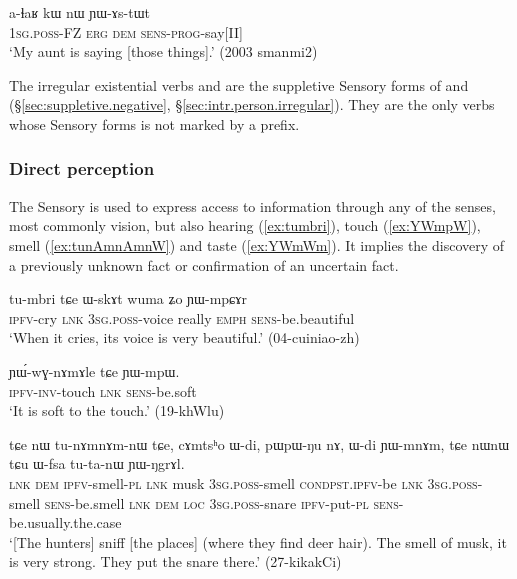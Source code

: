 \begin{exe}
\ex \label{ex:YAstWt}
\gll a-ɬaʁ kɯ nɯ ɲɯ-ɤs-tɯt \\
\textsc{1sg}.\textsc{poss}-FZ \textsc{erg} \textsc{dem} \textsc{sens}-\textsc{prog}-say[II] \\
\glt `My aunt is saying [those things].' (2003 smanmi2)
\end{exe}

The irregular existential verbs  and  are the suppletive Sensory forms of  and  (§\ref{sec:suppletive.negative}, §\ref{sec:intr.person.irregular}). They are the only verbs whose Sensory forms is not marked by a prefix. 



\subsubsection{Direct perception} \label{sec:sensory.evd}
The Sensory is used to express access to information \citep{tournadre14evidentiality} through any of the senses, most commonly vision, but also hearing (\ref{ex:tumbri}), touch (\ref{ex:YWmpW}), smell (\ref{ex:tunAmnAmnW}) and taste (\ref{ex:YWmWm}). It implies the discovery of a previously unknown fact or confirmation of an uncertain fact.

\begin{exe}
\ex \label{ex:tumbri}
\gll tu-mbri tɕe ɯ-skɤt wuma ʑo ɲɯ-mpɕɤr \\
\textsc{ipfv}-cry \textsc{lnk} \textsc{3sg}.\textsc{poss}-voice really \textsc{emph} \textsc{sens}-be.beautiful \\
\glt `When it cries, its voice is very beautiful.' (04-cuiniao-zh)
\end{exe}

\begin{exe}
\ex \label{ex:YWmpW}
\gll ɲɯ́-wɣ-nɤmɤle tɕe ɲɯ-mpɯ. \\
\textsc{ipfv}-\textsc{inv}-touch \textsc{lnk} \textsc{sens}-be.soft \\
\glt `It is soft to the touch.' (19-khWlu)
\end{exe}

\begin{exe}
\ex \label{ex:tunAmnAmnW}
\gll tɕe nɯ tu-nɤmnɤm-nɯ tɕe, cɤmtsʰo ɯ-di, pɯ\redp{}pɯ-ŋu nɤ, ɯ-di ɲɯ-mnɤm, tɕe nɯnɯ tɕu ɯ-fsa tu-ta-nɯ ɲɯ-ŋgrɤl. \\
\textsc{lnk} \textsc{dem} \textsc{ipfv}-smell-\textsc{pl} \textsc{lnk} musk \textsc{3sg}.\textsc{poss}-smell \textsc{cond\redp{}pst.ipfv}-be \textsc{lnk} \textsc{3sg}.\textsc{poss}-smell \textsc{sens}-be.smell \textsc{lnk} \textsc{dem} \textsc{loc} \textsc{3sg}.\textsc{poss}-snare \textsc{ipfv}-put-\textsc{pl} \textsc{sens}-be.usually.the.case \\
\glt `[The hunters] sniff [the places] (where they find deer hair). The smell of musk, it is very strong. They put the snare there.' (27-kikakCi)
\end{exe}

